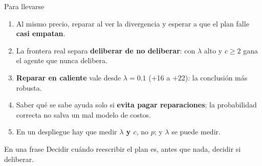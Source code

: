 \documentclass[aspectratio=169]{beamer}
\begin{document}
\begin{frame}{Para llevarse}
  \begin{enumerate}
    \item Al mismo precio, reparar al ver la divergencia y esperar a que el
      plan falle \textbf{casi empatan}.
    \item La frontera real separa \textbf{deliberar de no deliberar}: con
      $\lambda$ alto y $c\ge2$ gana el agente que nunca delibera.
    \item \textbf{Reparar en caliente} vale desde $\lambda=0.1$ (+16 a +22): la
      conclusión más robusta.
    \item Saber qué se sabe ayuda solo si \textbf{evita pagar reparaciones};
      la probabilidad correcta no salva un mal modelo de costos.
    \item En un despliegue hay que medir \textbf{$\lambda$ y $c$}, no $p$; y
      $\lambda$ se puede medir.
  \end{enumerate}
  \vspace{0.4em}
  \begin{exampleblock}{En una frase}
    Decidir cuándo reescribir el plan es, antes que nada, decidir si deliberar.
  \end{exampleblock}
\end{frame}
\end{document}
